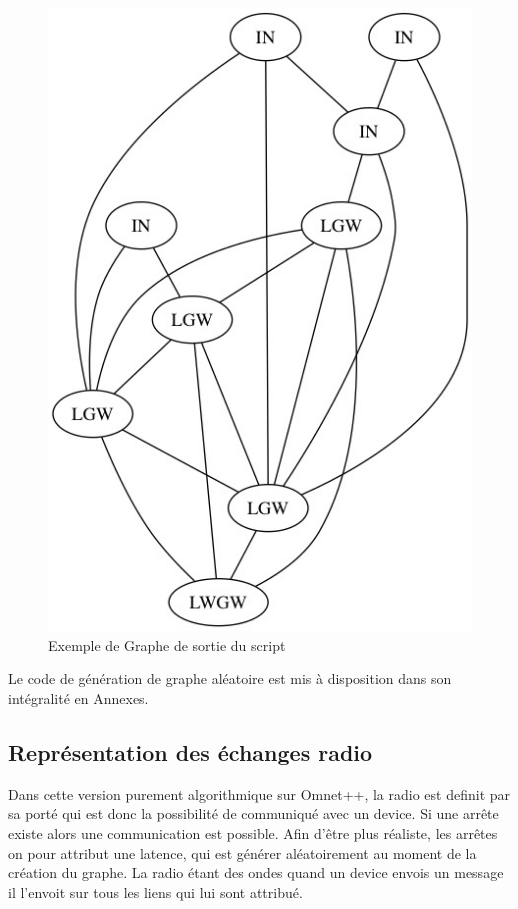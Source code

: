 \documentclass[11pt]{article}
\begin{document}
\begin{figure}[!h]
\centering
\includegraphics[scale=0.45]{LoRaGraph.jpg} 
\caption{Exemple de Graphe de sortie du script }
\end{figure}
Le code de génération de graphe aléatoire est mis à disposition dans son intégralité en Annexes.
\subsection{Représentation des échanges radio}
Dans cette version purement algorithmique sur Omnet++, la radio est definit par sa porté qui est donc la possibilité de communiqué avec un device. Si une arrête existe alors une communication est possible. Afin d'être plus réaliste, les arrêtes on pour attribut une latence, qui est générer aléatoirement au moment de la création du graphe. La radio étant des ondes quand un device envois un message il l'envoit sur tous les liens qui lui sont attribué.
\end{document}
